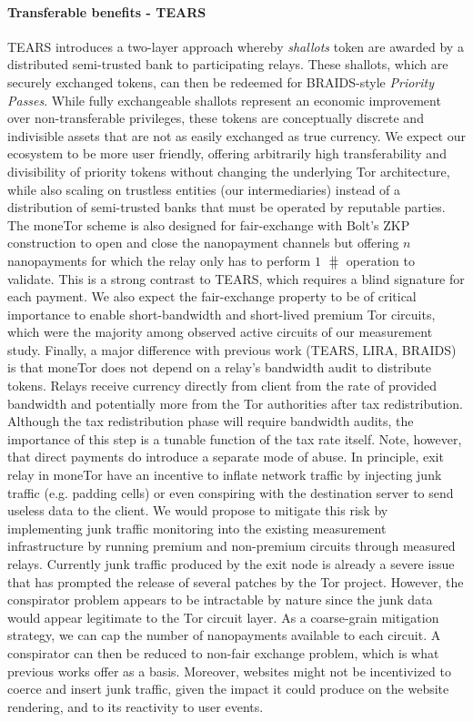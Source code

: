 \paragraph*{Transferable benefits - TEARS} TEARS introduces a two-layer approach
whereby \emph{shallots} token are awarded by a distributed semi-trusted bank to
participating relays. These shallots, which are securely exchanged tokens, can
then be redeemed for BRAIDS-style \emph{Priority Passes}. While fully
exchangeable shallots represent an economic improvement over non-transferable
privileges, these tokens are conceptually discrete and indivisible assets that
are not as easily exchanged as true currency. We expect our ecosystem to be more
user friendly, offering arbitrarily high transferability and divisibility of
priority tokens without changing the underlying Tor architecture, while also
scaling on trustless entities (our intermediaries) instead of a distribution of
semi-trusted banks that must be operated by reputable parties. The moneTor
scheme is also designed for fair-exchange with Bolt's ZKP construction to open
and close the nanopayment channels but offering $n$ nanopayments for which the
relay only has to perform $1$ $\hash$ operation to validate. This is a strong
contrast to TEARS, which requires a blind signature for each payment. We also
expect the fair-exchange property to be of critical importance to enable
short-bandwidth and short-lived premium Tor circuits, which were the majority
among observed active circuits of our measurement study. Finally, a major
difference with previous work (TEARS, LIRA, BRAIDS) is that moneTor does not
depend on a relay's bandwidth audit to distribute tokens. Relays receive
currency directly from client from the rate of provided bandwidth and
potentially more from the Tor authorities after tax redistribution. Although the
tax redistribution phase will require bandwidth audits, the importance of this
step is a tunable function of the tax rate itself. Note, however, that direct
payments do introduce a separate mode of abuse. In principle, exit relay in
moneTor have an incentive to inflate network traffic by injecting junk traffic
(e.g. padding cells) or even conspiring with the destination server to send
useless data to the client. We would propose to mitigate this risk by
implementing junk traffic monitoring into the existing measurement
infrastructure by running premium and non-premium circuits through measured
relays. Currently junk traffic produced by the exit node is already a severe
issue~\cite{rochet2018dropping} that has prompted the release of several patches
by the Tor project. However, the conspirator problem appears to be intractable
by nature since the junk data would appear legitimate to the Tor circuit layer.
As a coarse-grain mitigation strategy, we can cap the number of nanopayments
available to each circuit. A conspirator can then be reduced to non-fair
exchange problem, which is what previous works offer as a basis. Moreover,
websites might not be incentivized to coerce and insert junk traffic, given the
impact it could produce on the website rendering, and to its reactivity to user
events.



